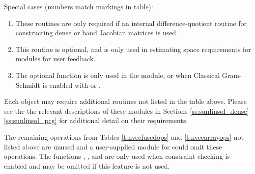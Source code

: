Special cases (numbers match markings in table):
\begin{enumerate}
\item These routines are only required if an internal
  difference-quotient routine for constructing dense or band
  Jacobian matrices is used.
\item This routine is optional, and is only used in estimating
  space requirements for {\cvodes} modules for user feedback.
\item The optional function  is only used in the
  {\sunnonlinsolfixedpoint} module, or when Classical Gram-Schmidt is
  enabled with {\spgmr} or {\spfgmr}.
\end{enumerate}

Each {\sunlinsol} object may require additional {\nvector} routines
not listed in the table above.  Please see the the relevant
descriptions of these modules in Sections
\ref{ss:sunlinsol_dense}-\ref{ss:sunlinsol_pcg} for additional detail
on their {\nvector} requirements.

The remaining operations from
Tables \ref{t:nvecfusedops} and \ref{t:nvecarrayops} not listed above
are unused and a user-supplied {\nvector} module for {\cvode} could
omit these operations.  The functions ,
, and  are only used when
constraint checking is enabled and may be omitted if this feature is
not used.











